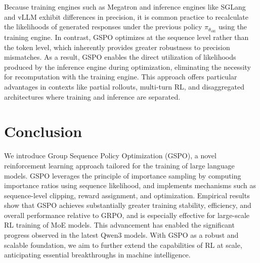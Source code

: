 Because training engines such as Megatron and inference engines like SGLang and vLLM exhibit differences in precision, it is common practice to recalculate the likelihoods of generated responses under the previous policy $\pi_{\theta_\text{old}}$ using the training engine. In contrast, GSPO optimizes at the sequence level rather than the token level, which inherently provides greater robustness to precision mismatches. As a result, GSPO enables the direct utilization of likelihoods produced by the inference engine during optimization, eliminating the necessity for recomputation with the training engine. This approach offers particular advantages in contexts like partial rollouts, multi-turn RL, and disaggregated architectures where training and inference are separated.

\section{Conclusion}

We introduce Group Sequence Policy Optimization (GSPO), a novel reinforcement learning approach tailored for the training of large language models. GSPO leverages the principle of importance sampling by computing importance ratios using sequence likelihood, and implements mechanisms such as sequence-level clipping, reward assignment, and optimization. Empirical results show that GSPO achieves substantially greater training stability, efficiency, and overall performance relative to GRPO, and is especially effective for large-scale RL training of MoE models. This advancement has enabled the significant progress observed in the latest Qwen3 models. With GSPO as a robust and scalable foundation, we aim to further extend the capabilities of RL at scale, anticipating essential breakthroughs in machine intelligence.

